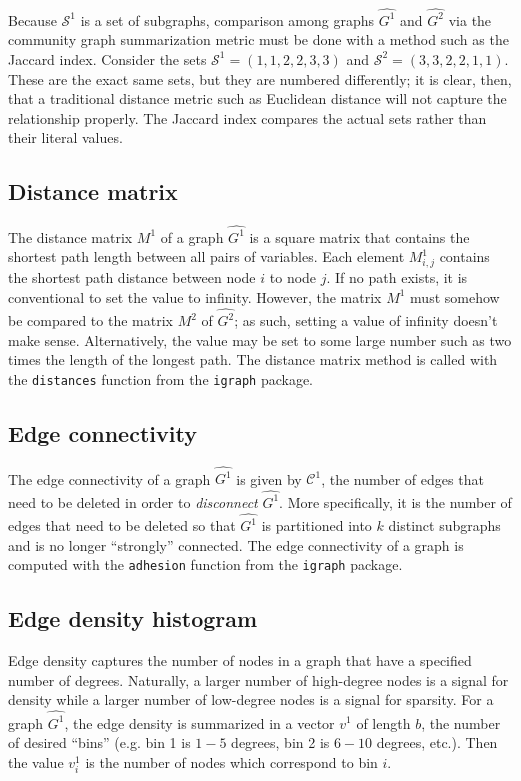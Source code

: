 Because $\mathcal{S}^1$ is a set of subgraphs, comparison among 
graphs $\hat{G^1}$ and $\hat{G^2}$ via the community graph summarization metric 
must be done with a method such as the Jaccard index. 
Consider the sets $\mathcal{S}^1=(1,1,2,2,3,3)$ and 
$\mathcal{S}^2=(3,3,2,2,1,1)$. These are 
the exact same sets, but they are numbered differently; it is clear, then, that 
a traditional distance metric such as Euclidean distance will not capture the 
relationship properly. The Jaccard index compares the actual sets rather than 
their literal values.

\subsection{Distance matrix}

The distance matrix $M^1$ of a graph $\hat{G^1}$ is a square matrix that 
contains the shortest path length 
between all pairs of variables. Each element $M^1_{i,j}$ 
contains the shortest path distance between node $i$ to node $j$. If no path 
exists, it is conventional to set the value to infinity. However, the matrix 
$M^1$ must somehow be compared to the matrix $M^2$ of $\hat{G^2}$; as such, 
setting a value of infinity doesn't make sense. Alternatively, the value may be 
set to some large number such as two times the length of the longest path. The 
distance matrix method is called with the \texttt{distances} function from the 
\texttt{igraph} package.

\subsection{Edge connectivity}

The edge connectivity of a graph $\hat{G^1}$ is given by $\mathcal{C}^1$, the 
number of edges that need to be deleted in order to \textit{disconnect} 
$\hat{G^1}$. More specifically, it is the number of edges that need to be 
deleted so that $\hat{G^1}$ is partitioned into $k$ distinct subgraphs and is
no longer ``strongly'' connected. The edge connectivity of a graph is computed 
with the \texttt{adhesion} function from the \texttt{igraph} package.

\subsection{Edge density histogram}

Edge density captures the number of nodes in a graph that have a specified 
number of degrees. Naturally, a larger number of high-degree nodes is a signal 
for density while a larger number of low-degree nodes is a signal for sparsity.
For a graph $\hat{G^1}$, the edge density is summarized in a 
vector $v^1$ of length $b$, the number of desired ``bins'' (e.g. bin 1 is $1-5$ 
degrees, bin 2 is $6-10$ degrees, etc.). Then the value $v^1_i$ is the number 
of nodes which correspond to bin $i$.

